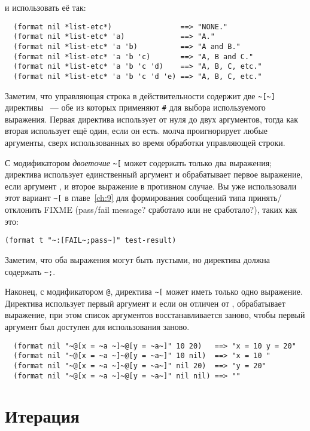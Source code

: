 и использовать её так:

\begin{verbatim}
  (format nil *list-etc*)                ==> "NONE."
  (format nil *list-etc* 'a)             ==> "A."
  (format nil *list-etc* 'a 'b)          ==> "A and B."
  (format nil *list-etc* 'a 'b 'c)       ==> "A, B and C."
  (format nil *list-etc* 'a 'b 'c 'd)    ==> "A, B, C, etc."
  (format nil *list-etc* 'a 'b 'c 'd 'e) ==> "A, B, C, etc."
\end{verbatim}

Заметим, что управляющая строка в действительности содержит две \lstinline!~[~]! директивы
~--- обе из которых применяют \lstinline!#! для выбора используемого выражения. Первая
директива использует от нуля до двух аргументов, тогда как вторая использует ещё один,
если он есть.  молча проигнорирует любые аргументы, сверх использованных во
время обработки управляющей строки.

С модификатором \textit{двоеточие} \lstinline!~[! может содержать только два выражения;
директива использует единственный аргумент и обрабатывает первое выражение, если аргумент
, и второе выражение в противном случае. Вы уже использовали этот вариант
\lstinline!~[! в главе~\ref{ch:9} для формирования сообщений типа принять/отклонить FIXME
  (pass/fail message? сработало или не сработало?), таких как это:

\begin{lstlisting}
(format t "~:[FAIL~;pass~]" test-result)
\end{lstlisting}

Заметим, что оба выражения могут быть пустыми, но директива должна содержать
\lstinline!~;!.

Наконец, с модификатором \lstinline!@!, директива \lstinline!~[! может иметь только одно
выражение. Директива использует первый аргумент и если он отличен от ,
обрабатывает выражение, при этом список аргументов восстанавливается заново, чтобы первый
аргумент был доступен для использования заново.

\begin{verbatim}
  (format nil "~@[x = ~a ~]~@[y = ~a~]" 10 20)   ==> "x = 10 y = 20"
  (format nil "~@[x = ~a ~]~@[y = ~a~]" 10 nil)  ==> "x = 10 "
  (format nil "~@[x = ~a ~]~@[y = ~a~]" nil 20)  ==> "y = 20"
  (format nil "~@[x = ~a ~]~@[y = ~a~]" nil nil) ==> ""
\end{verbatim}

\section{Итерация}

